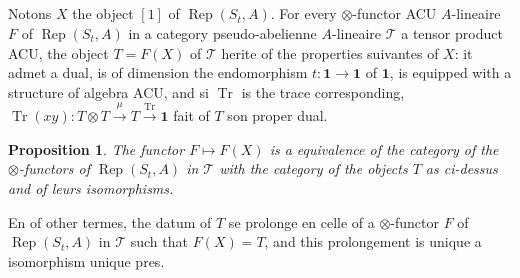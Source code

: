 \documentclass[11pt,a4paper]{article}
\theoremstyle{plain}
\newtheorem{proposition}[theorem]{Proposition}
\theoremstyle{definition}
\DeclareMathOperator{\Tr}{Tr}
\DeclareMathOperator{\Rep}{Rep}
\begin{document}
\subsection{}
Notons $X$ the object $[1]$ of $\Rep(S_t, A)$. For every $\otimes$-functor ACU $A$-lineaire $F$ of $\Rep(S_t, A)$ in a category pseudo-abelienne $A$-lineaire $\mathcal{T}$ a tensor product ACU, the object $T = F(X)$ of $\mathcal{T}$ herite of the properties suivantes of $X$: it admet a dual, is of dimension the endomorphism $t : \mathbf{1} \to \mathbf{1}$ of $\mathbf{1}$, is equipped with a structure of algebra ACU, and si $\Tr$ is the trace corresponding, $\Tr(xy) : T \otimes T \xrightarrow{\mu} T \xrightarrow{\Tr} \mathbf{1}$ fait of $T$ son proper dual.

\begin{proposition}
The functor $F \mapsto F(X)$ is a equivalence of the category of the $\otimes$-functors of $\Rep(S_t, A)$ in $\mathcal{T}$ with the category of the objects $T$ as ci-dessus and of leurs isomorphisms.
\end{proposition}

En of other termes, the datum of $T$ se prolonge en celle of a $\otimes$-functor $F$ of $\Rep(S_t, A)$ in $\mathcal{T}$ such that $F(X) = T$, and this prolongement is unique a isomorphism unique pres.
\end{document}
